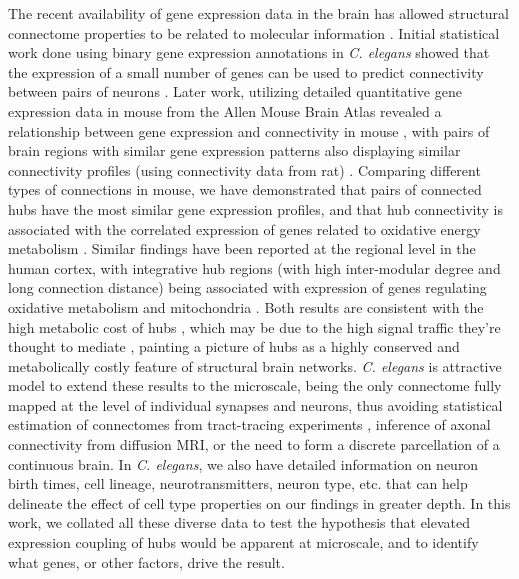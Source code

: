 \documentclass[10pt,letterpaper]{article}
\begin{document}
The recent availability of gene expression data in the brain has allowed structural connectome properties to be related to molecular information \cite{vandenHeuvel:2017ex}.
Initial statistical work done using binary gene expression annotations in \emph{C. elegans} showed that the expression of a small number of genes can be used to predict connectivity between pairs of neurons \cite{Varadan:2006ek, Kaufman2006, Baruch2008b}.
Later work, utilizing detailed quantitative gene expression data in mouse from the Allen Mouse Brain Atlas \cite{Lein:2007jn} revealed a relationship between gene expression and connectivity in mouse \cite{Ji:2014jw, Fakhry:2015kl}, with pairs of brain regions with similar gene expression patterns also displaying similar connectivity profiles (using connectivity data from rat) \cite{French2011}.
Comparing different types of connections in mouse, we have demonstrated that pairs of connected hubs have the most similar gene expression profiles, and that hub connectivity is associated with the correlated expression of genes related to oxidative energy metabolism \cite{Fulcher:2016ck}.
Similar findings have been reported at the regional level in the human cortex, with integrative hub regions (with high inter-modular degree and long connection distance) being associated with expression of genes regulating oxidative metabolism and mitochondria \cite{Vertes2016a}.
Both results are consistent with the high metabolic cost of hubs \cite{Collin:2014kq, Tomasi:2013kl}, which may be due to the high signal traffic they're thought to mediate \cite{vandenHeuvel:2012kh, Misic:2014it}, painting a picture of hubs as a highly conserved and metabolically costly feature of structural brain networks.
\emph{C. elegans} is attractive model to extend these results to the microscale, being the only connectome fully mapped at the level of individual synapses and neurons, thus avoiding statistical estimation of connectomes from tract-tracing experiments \cite{Ypma:2016em}, inference of axonal connectivity from diffusion MRI, or the need to form a discrete parcellation of a continuous brain.
In \emph{C. elegans}, we also have detailed information on neuron birth times, cell lineage, neurotransmitters, neuron type, etc. that can help delineate the effect of cell type properties on our findings in greater depth.
In this work, we collated all these diverse data to test the hypothesis that elevated expression coupling of hubs would be apparent at microscale, and to identify what genes, or other factors, drive the result.
\end{document}
